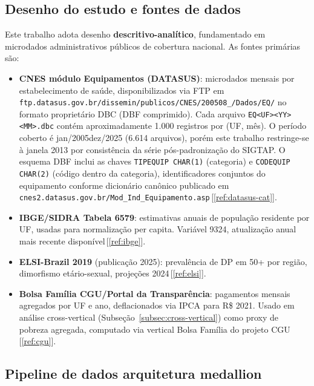 \documentclass[12pt,a4paper,oneside]{article}
\begin{document}
\subsection{Desenho do estudo e fontes de dados}

Este trabalho adota desenho \textbf{descritivo-analítico},
fundamentado em microdados administrativos públicos de cobertura
nacional. As fontes primárias são:

\begin{itemize}
\item \textbf{CNES \textendash{} módulo Equipamentos (DATASUS)}:
microdados mensais por estabelecimento de saúde, disponibilizados
via FTP em
\texttt{ftp.datasus.gov.br/dissemin/publicos/CNES/200508\_/Dados/EQ/}
no formato proprietário DBC (DBF comprimido). Cada arquivo
\texttt{EQ<UF><YY><MM>.dbc} contém aproximadamente 1.000
registros por (UF, mês). O período coberto é jan/2005\textendash dez/2025
(6.614 arquivos), porém este trabalho restringe-se à janela
2013 por consistência da série pós-padronização do
SIGTAP. O esquema DBF inclui as chaves \texttt{TIPEQUIP CHAR(1)}
(categoria) e \texttt{CODEQUIP CHAR(2)} (código dentro da categoria),
identificadores conjuntos do equipamento conforme dicionário
canônico publicado em
\texttt{cnes2.datasus.gov.br/Mod\_Ind\_Equipamento.asp}\,[\ref{ref:datasus-cat}].

\item \textbf{IBGE/SIDRA \textendash{} Tabela 6579}: estimativas
anuais de população residente por UF, usadas para normalização per
capita. Variável 9324, atualização anual mais recente
disponível\,[\ref{ref:ibge}].

\item \textbf{ELSI-Brazil 2019} (publicação 2025):
prevalência de DP em 50+ por região, dimorfismo etário-sexual,
projeções 2024\,[\ref{ref:elsi}].

\item \textbf{Bolsa Família \textendash{} CGU/Portal da Transparência}:
pagamentos mensais agregados por UF e ano, deflacionados via IPCA
para R\$ 2021. Usado em análise cross-vertical
(Subseção~\ref{subsec:cross-vertical}) como proxy de pobreza
agregada, computado via vertical Bolsa Família do projeto
CGU\,[\ref{ref:cgu}].
\end{itemize}

\subsection{Pipeline de dados \textendash{} arquitetura medallion}
\end{document}
